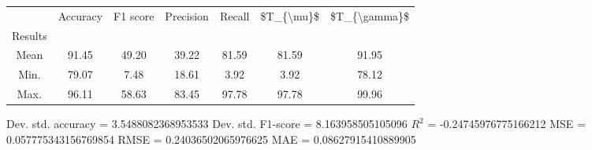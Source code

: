 \begin{tabular}{|c|c|c|c|c|c|c|}
\toprule
{} &  Accuracy &  F1 score &  Precision &  Recall &  \$T\_\{\textbackslash mu\}\$ &  \$T\_\{\textbackslash gamma\}\$ \\
Results &           &           &            &         &            &               \\
\hline
Mean    &     91.45 &     49.20 &      39.22 &   81.59 &      81.59 &         91.95 \\
Min.    &     79.07 &      7.48 &      18.61 &    3.92 &       3.92 &         78.12 \\
Max.    &     96.11 &     58.63 &      83.45 &   97.78 &      97.78 &         99.96 \\
\bottomrule
\end{tabular}

 Dev. std. accuracy = 3.5488082368953533
 Dev. std. F1-score = 8.163958505105096
 $R^2$ = -0.24745976775166212
 MSE = 0.057775343156769854
 RMSE = 0.24036502065976625
 MAE = 0.08627915410889905